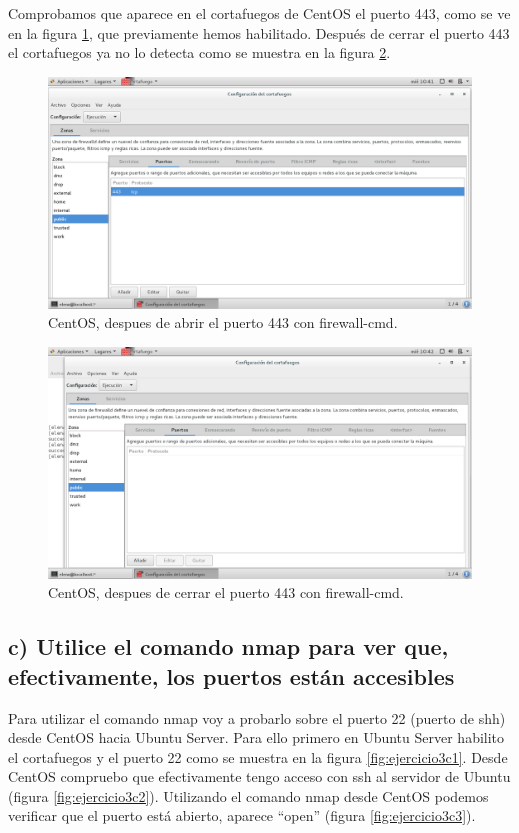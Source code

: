 Comprobamos que aparece en el cortafuegos de CentOS el puerto 443, como se ve en la figura \ref{fig:ejercicio3b443a}, que previamente hemos habilitado. Después de cerrar el puerto 443 el cortafuegos ya no lo detecta como se muestra en la figura \ref{fig:ejercicio3b443b}.
\begin{figure}[H] 
	\centering
	\includegraphics[width=15cm]{./img/ejercicio3b443a.png} 	
	\caption{CentOS, despues de abrir el puerto 443 con firewall-cmd.} \label{fig:ejercicio3b443a}
\end{figure}
\begin{figure}[H] 
	\centering
	\includegraphics[width=15cm]{./img/ejercicio3b443b.png} 	
	\caption{CentOS, despues de cerrar el puerto 443 con firewall-cmd.} \label{fig:ejercicio3b443b}
\end{figure}


\subsection{c) Utilice el comando nmap para ver que, efectivamente, los puertos están accesibles}
Para utilizar el comando nmap voy a probarlo sobre el puerto 22 (puerto de shh) desde CentOS hacia Ubuntu Server. Para ello primero en Ubuntu Server habilito el cortafuegos y el puerto 22 como se muestra en la figura \ref{fig:ejercicio3c1}. Desde CentOS compruebo que efectivamente tengo acceso con ssh al servidor de Ubuntu (figura \ref{fig:ejercicio3c2}).
Utilizando el comando nmap desde CentOS podemos verificar que el puerto está abierto, aparece ``open'' (figura \ref{fig:ejercicio3c3}).


